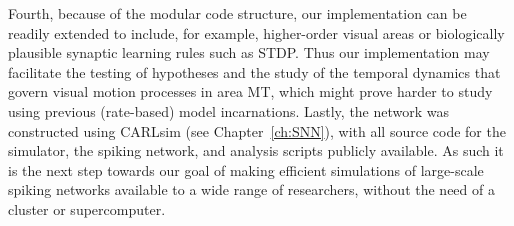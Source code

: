 Fourth, because of the modular code structure, our implementation
can be readily extended to include, for example,
higher-order visual areas or biologically plausible synaptic
learning rules such as \ac{STDP}. Thus our implementation may
facilitate the testing of hypotheses and the study of the temporal
dynamics that govern visual motion processes in area
\ac{MT}, which might prove harder to study using previous (rate-based)
model incarnations.
Lastly, the network was constructed using CARLsim 
(see Chapter~\ref{ch:SNN}), with all source code for the simulator,
the spiking network, and analysis scripts publicly available.
As such it is the next step towards our goal
of making efficient simulations of large-scale spiking networks
available to a wide range of researchers, without the
need of a cluster or supercomputer.

